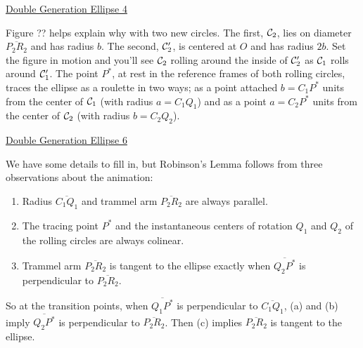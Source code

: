 \documentclass{ximera}
\begin{document}
\begin{onlineOnly}
    \begin{center}
\end{center}
\end{onlineOnly}

\href{https://www.desmos.com/calculator/rheveebavy}{Double Generation Ellipse 4}

Figure ?? helps explain why with two new circles. The first, ${\cal C}_2$, lies on diameter $\overline{P_2R_2}$ and has radius $b$. The second, ${\cal C}_2^\prime$, is centered at $O$ and has radius $2b$. Set the figure in motion and you'll see ${\cal C}_2$ rolling around the inside of ${\cal C}_2^\prime$ as ${\cal C}_1$ rolls around ${\cal C}_1^\prime$. The point $P^*$, at rest in the reference frames of both rolling circles, traces the ellipse as a roulette in two ways; as a point attached $b=C_1P^*$ units from the center of ${\cal C}_1$ (with radius $a=C_1Q_1$) and as a point $a=C_2P^*$ units from the center of ${\cal C}_2$ (with radius $b=C_2Q_2$).

\begin{onlineOnly}
    \begin{center}
\end{center}
\end{onlineOnly}

\href{https://www.desmos.com/calculator/2gnd3kgvyz}{Double Generation Ellipse 6}

We have some details to fill in, but Robinson's Lemma follows from three observations about the animation:

\begin{enumerate}
\item Radius $\overline{C_1Q_1}$ and trammel arm $\overline{P_2R_2}$ are always parallel.

\item The tracing point $P^*$ and the instantaneous centers of rotation $Q_1$ and $Q_2$ of the rolling circles are always colinear.

\item Trammel arm $\overline{P_2R_2}$  is tangent to the ellipse exactly when $\overline{Q_2P^*}$ is perpendicular to $\overline{P_2R_2}$.
\end{enumerate}

So at the transition points, when $\overline{Q_1P^*}$ is perpendicular to $\overline{C_1Q_1}$, (a) and (b) imply $\overline{Q_2P^*}$ is perpendicular to $\overline{P_2R_2}$. Then (c) implies $\overline{P_2R_2}$ is tangent to the ellipse. 
\end{document}
